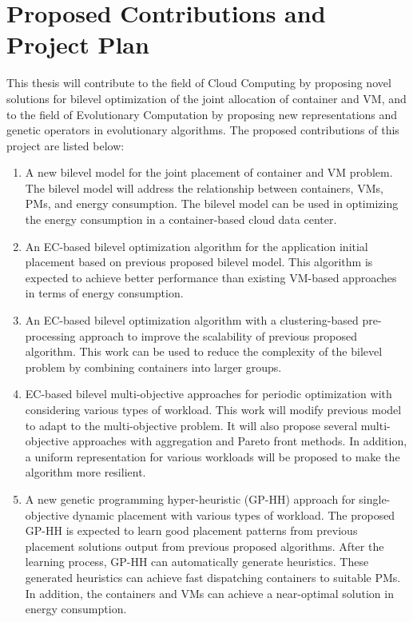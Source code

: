 \chapter{Proposed Contributions and Project Plan}\label{C:con}

This thesis will contribute to the field of Cloud Computing by proposing novel solutions for bilevel optimization of the joint allocation of container and VM, and to the field of Evolutionary Computation by proposing new representations and genetic operators in evolutionary algorithms. The proposed contributions of this project are listed below:
 
\begin{enumerate}
	\item A new bilevel model for the joint placement of container and VM problem.  The bilevel model will address the relationship between containers, VMs, PMs, and energy consumption. The bilevel model can be used in optimizing the energy consumption in a container-based cloud data center.
	\item An EC-based bilevel optimization algorithm for the application initial placement based on previous proposed bilevel model. This algorithm is expected to achieve better performance than existing VM-based approaches in terms of energy consumption. 
	\item An EC-based bilevel optimization algorithm with a clustering-based pre-processing approach to improve the scalability of previous proposed algorithm. This work can be used to reduce the complexity of the bilevel problem by combining containers into larger groups.
	\item EC-based bilevel multi-objective approaches for periodic optimization with considering various types of workload.
	This work will modify previous model to adapt to the multi-objective problem. It will also propose several multi-objective approaches with aggregation and Pareto front methods. In addition, a uniform representation for various workloads will be proposed to make the algorithm more resilient.
	\item A new genetic programming hyper-heuristic (GP-HH) approach for single-objective dynamic placement with various types of workload. The proposed GP-HH is expected to learn good placement patterns from previous placement solutions output from previous proposed algorithms. After the learning process, GP-HH can automatically generate heuristics. These generated heuristics can achieve fast dispatching containers to suitable PMs. In addition, the containers and VMs can achieve a near-optimal solution in energy consumption.
\end{enumerate}

